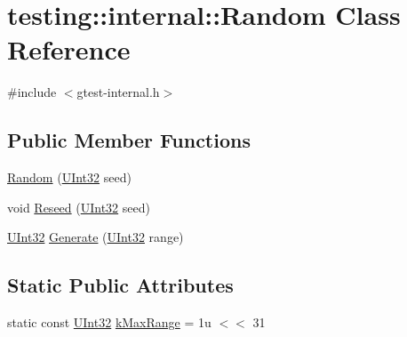\hypertarget{classtesting_1_1internal_1_1_random}{\section{testing\+:\+:internal\+:\+:Random Class Reference}
\label{classtesting_1_1internal_1_1_random}
}


{\ttfamily \#include $<$gtest-\/internal.\+h$>$}

\subsection*{Public Member Functions}
\begin{DoxyCompactItemize}
\item 
\hyperlink{classtesting_1_1internal_1_1_random_a6e112be5e7cce00551f6383025f69460}{Random} (\hyperlink{namespacetesting_1_1internal_a40d4fffcd2bf56f18b1c380615aa85e3}{U\+Int32} seed)
\item 
void \hyperlink{classtesting_1_1internal_1_1_random_adf2f24199318a46f885c78f50d89a69e}{Reseed} (\hyperlink{namespacetesting_1_1internal_a40d4fffcd2bf56f18b1c380615aa85e3}{U\+Int32} seed)
\item 
\hyperlink{namespacetesting_1_1internal_a40d4fffcd2bf56f18b1c380615aa85e3}{U\+Int32} \hyperlink{classtesting_1_1internal_1_1_random_a9315b7fb621cbcfdf92ed4b5e584c0db}{Generate} (\hyperlink{namespacetesting_1_1internal_a40d4fffcd2bf56f18b1c380615aa85e3}{U\+Int32} range)
\end{DoxyCompactItemize}
\subsection*{Static Public Attributes}
\begin{DoxyCompactItemize}
\item 
static const \hyperlink{namespacetesting_1_1internal_a40d4fffcd2bf56f18b1c380615aa85e3}{U\+Int32} \hyperlink{classtesting_1_1internal_1_1_random_a36d72dd7063d0b5338f229e75382fdd2}{k\+Max\+Range} = 1u $<$$<$ 31
\end{DoxyCompactItemize}


